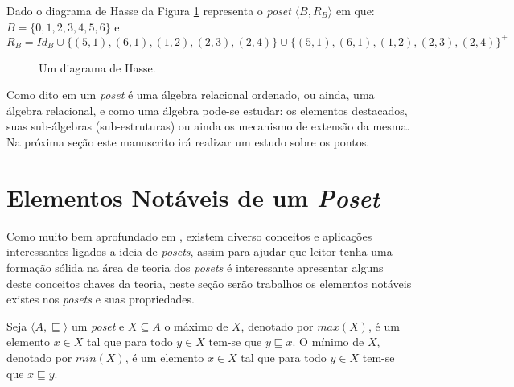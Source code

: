 \begin{exemplo}
  Dado o diagrama de Hasse da Figura \ref{fig:DiagramaHasse6} representa o \textit{poset} $\langle B, R_B \rangle$ em que: $B = \{0, 1, 2, 3, 4, 5, 6\}$ e 
  $$R_B = Id_B \cup \{(5, 1), (6, 1), (1, 2), (2, 3), (2, 4)\} \cup  \{(5, 1), (6, 1), (1, 2), (2, 3), (2, 4)\}^+$$
\end{exemplo}

\begin{figure}[h]
  \centering
  \caption{Um diagrama de Hasse.}
  \label{fig:DiagramaHasse6}
\end{figure}

Como dito em \cite{carmo2013} um \textit{poset} é uma álgebra relacional ordenado, ou ainda, uma álgebra relacional, e como uma álgebra pode-se estudar: os elementos destacados, suas sub-álgebras (sub-estruturas) ou ainda os mecanismo de extensão da mesma. Na próxima seção este manuscrito irá realizar um estudo sobre os pontos.

\section{Elementos Notáveis de um \textit{Poset}}\label{sec:ElementosNotaveisPoset}

Como muito bem aprofundado em \cite{carmo2013, morgado1962poset, neggers1998poset}, existem diverso conceitos e aplicações interessantes ligados a ideia de \textit{posets}, assim para ajudar que leitor tenha uma formação sólida na área de teoria dos \textit{posets} é interessante apresentar alguns deste conceitos chaves da teoria, neste seção serão trabalhos os elementos notáveis existes nos \textit{posets} e suas propriedades.

\begin{definicao}\label{def:MaxMinPoset}
	Seja $\langle A, \sqsubseteq \rangle$ um \textit{poset} e $X \subseteq A$ o máximo de $X$, denotado por $max(X)$, é um elemento $x \in X$ tal que para todo $y \in X$ tem-se que $y \sqsubseteq x$. O mínimo de $X$, denotado por $min(X)$,  é um elemento $x \in X$ tal que  para todo $y \in X$ tem-se que $x \sqsubseteq y$.
\end{definicao}

